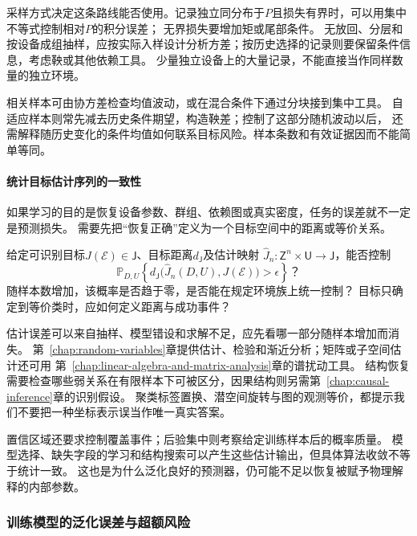 采样方式决定这条路线能否使用。记录独立同分布于$P$且损失有界时，可以用集中不等式控制相对$P$的积分误差；
无界损失要增加矩或尾部条件。
无放回、分层和按设备成组抽样，应按实际入样设计分析方差；按历史选择的记录则要保留条件信息，考虑鞅或其他依赖工具。
少量独立设备上的大量记录，不能直接当作同样数量的独立环境。

相关样本可由协方差检查均值波动，或在混合条件下通过分块接到集中工具。
自适应样本则常先减去历史条件期望，构造鞅差；控制了这部分随机波动以后，
还需解释随历史变化的条件均值如何联系目标风险。样本条数和有效证据因而不能简单等同。

\paragraph{统计目标估计序列的一致性}
\label{sec:future-analysis-statistical-recovery}

如果学习的目的是恢复设备参数、群组、依赖图或真实密度，任务的误差就不一定是预测损失。
需要先把“恢复正确”定义为一个目标空间中的距离或等价关系。

\begin{mathproblem}[估计映射的恢复误差与统计一致性]
  \label{question:future-statistical-recovery}
  给定可识别目标$J(\mathcal E)\in\mathsf J$、目标距离$d_{\mathsf J}$及估计映射
  $\widehat J_n:\mathsf Z^n\times\mathsf U\to\mathsf J$，能否控制
  \[
    \mathbb P_{D,U}\!\left\{
      d_{\mathsf J}\bigl(\widehat J_n(D,U),J(\mathcal E)\bigr)>\epsilon
    \right\}\text{？}
  \]
  随样本数增加，该概率是否趋于零，是否能在规定环境族上统一控制？
  目标只确定到等价类时，应如何定义距离与成功事件？
\end{mathproblem}

估计误差可以来自抽样、模型错设和求解不足，应先看哪一部分随样本增加而消失。
第~\ref{chap:random-variables}章提供估计、检验和渐近分析；矩阵或子空间估计还可用
第~\ref{chap:linear-algebra-and-matrix-analysis}章的谱扰动工具。
结构恢复需要检查哪些弱关系在有限样本下可被区分，因果结构则另需第~\ref{chap:causal-inference}章的识别假设。
聚类标签置换、潜空间旋转与图的观测等价，都提示我们不要把一种坐标表示误当作唯一真实答案。

置信区域还要求控制覆盖事件；后验集中则考察给定训练样本后的概率质量。
模型选择、缺失字段的学习和结构搜索可以产生这些估计输出，但具体算法收敛不等于统计一致。
这也是为什么泛化良好的预测器，仍可能不足以恢复被赋予物理解释的内部参数。

\subsubsection{训练模型的泛化误差与超额风险}
\label{sec:future-analysis-learned-risk}

